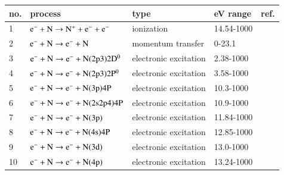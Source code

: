 \begin{table}
  \center{}
  \begin{threeparttable}
    \label{tab:tableN}
    \begin{tabular*}{\textwidth}{l@{\extracolsep{\fill}}llll}
    \toprule
    {no.}  & {process} & {type} &  {eV range}  &  {ref.} \\
    \midrule
      1 & $\rm e^- + N \rightarrow N^+ + e^- + e^-$  &  ionization   &  14.54-1000 &   \cite{lxc:2024:morgan} \\ 
      \midrule     
      2 & $\rm e^- + N \rightarrow e^- + N$  &  momentum transfer   &  0-23.1  & \cite{lxc:2024:morgan}\\   
      \midrule
      3 & $\rm e^- + N \rightarrow e^- + N(2p3)2D^0 $  &  electronic excitation   &  2.38-1000 & \cite{lxc:2024:morgan}\\ 
      4 & $\rm e^- + N \rightarrow e^- + N(2p3)2P^0 $  &  electronic excitation   &  3.58-1000 & \cite{lxc:2024:morgan}\\ 
      5 & $\rm e^- + N \rightarrow e^- + N(3p)4P $  &  electronic excitation   &  10.3-1000 & \cite{lxc:2024:morgan}\\ 
      6 & $\rm e^- + N \rightarrow e^- + N(2s2p4)4P $  &  electronic excitation   &  10.9-1000 & \cite{lxc:2024:morgan}\\ 
      7 & $\rm e^- + N \rightarrow e^- + N(3p) $  &  electronic excitation   &  11.84-1000 & \cite{lxc:2024:morgan}\\ 
      8 & $\rm e^- + N \rightarrow e^- + N(4s)4P $  &  electronic excitation   &  12.85-1000 & \cite{lxc:2024:morgan}\\ 
      9 & $\rm e^- + N \rightarrow e^- + N(3d) $  &  electronic excitation   &  13.0-1000 & \cite{lxc:2024:morgan}\\ 
      10 & $\rm e^- + N \rightarrow e^- + N(4p) $  &  electronic excitation   &  13.24-1000 & \cite{lxc:2024:morgan}\\ 
    \bottomrule
    \end{tabular*}
   \end{threeparttable}
\end{table}

